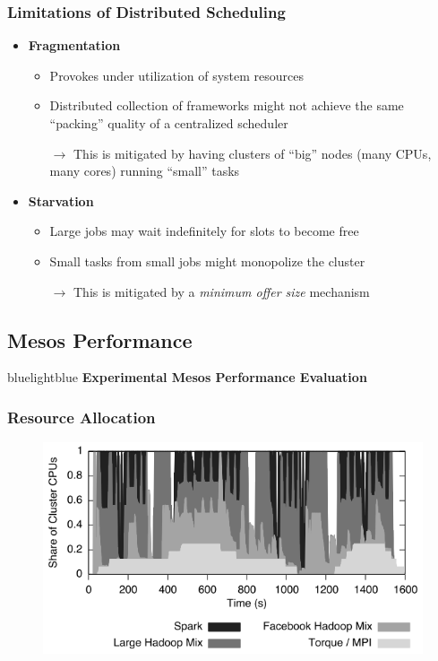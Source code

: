 \begin{frame}
\frametitle{Limitations of Distributed Scheduling}
\begin{itemize}
	\item {\bf Fragmentation}
	\begin{itemize}
		\item Provokes under utilization of system resources
		\item Distributed collection of frameworks might not achieve the same ``packing'' quality of a centralized scheduler
		\item[$\to$] This is mitigated by having clusters of ``big'' nodes (many CPUs, many cores) running ``small'' tasks
	\end{itemize}

\vspace{20pt}

	\item {\bf Starvation}
	\begin{itemize}
		\item Large jobs may wait indefinitely for slots to become free
		\item Small tasks from small jobs might monopolize the cluster
		\item[$\to$] This is mitigated by a {\it minimum offer size} mechanism
	\end{itemize}
\end{itemize}
\end{frame}

\subsection{Mesos Performance}
\begin{frame}
 \begin{colorblock}{blue}{lightblue}{ }
    \Large \textbf{Experimental Mesos Performance Evaluation}
  \end{colorblock}
\end{frame}

\begin{frame}
\frametitle{Resource Allocation}
\begin{figure}[h]
  \centering
  \includegraphics[scale=0.55]{./figures/mesos_perf_fm}
  \label{fig:mesos_perf_ru}
\end{figure}
\end{frame}

